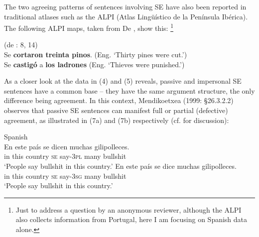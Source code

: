 \documentclass[output=paper]{langsci/langscibook}
\begin{document}
The two agreeing patterns of sentences involving SE have also been reported in traditional atlases such as the ALPI (Atlas Lingüístico de la Península Ibérica). The following ALPI maps, taken from De \citet{Benito2010}, show this: \footnote{Just to address a question by an anonymous reviewer, although the ALPI also collects information from Portugal, here I am focusing on Spanish data alone.} 

\ea%
    (de \citealt{Benito2010}: 8, 14)
    \label{ex:gallego:6}\\
    \ea Se \textbf{cortaron treinta pinos}. (Eng. ‘Thirty pines were cut.’)\\
    \ex Se \textbf{castigó} a \textbf{los ladrones} (Eng. ‘Thieves were punished.’)\\
    \z
\z

As a closer look at the data in (4) and (5) reveals, passive and impersonal SE sentences have a common base – they have the same argument structure, the only difference being agreement. In this context, Mendikoetxea (1999: §26.3.2.2) observes that passive SE sentences can manifest full or partial (defective) agreement, as illustrated in (7a) and (7b) respectively (cf. \citealt{Zorraquino1979} for discussion):

\ea%
    Spanish\label{ex:gallego:7}\\
    \ea
    \gll En  este  país        se   dicen       muchas  gilipolleces.       \\
         in   this   country  \textsc{se}  say\textsc{{}-3pl}  many     bullshit\\
    \glt ‘People say bullshit in this country.’
    \ex
    \gll En  este  país        se   dice        muchas  gilipolleces.       \\
         in   this   country  \textsc{se} say\textsc{{}-3sg}  many     bullshit \\
    \glt ‘People say bullshit in this country.’
    \z
\z
\end{document}
